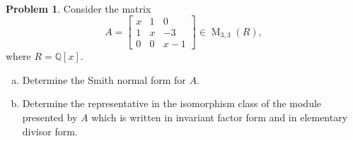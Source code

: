 \documentclass[11pt]{article}
\DeclareMathOperator{\M}{M}
\newcommand{\Q}{\mathbb{Q}}
\theoremstyle{definition}
\newtheorem{problem}{Problem}
\begin{document}
\

\begin{problem}
Consider the matrix 
$$A=\begin{bmatrix}
x & 1 & 0 \\
1 & x & -3 \\
0 & 0 & x-1
\end{bmatrix}
\in \M_{3,3}(R),$$ 
where $R=\Q[x]$. 
\begin{enumerate}[a)]
\item Determine the Smith normal form for $A$.
\item Determine the representative in the isomorphism class of the module presented by $A$ which is written in invariant factor form and in elementary divisor form.
\end{enumerate}
\end{problem}
\end{document}
